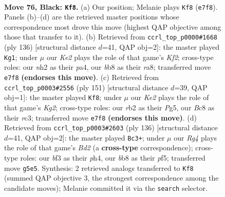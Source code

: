 \documentclass[11pt]{article}
\begin{document}
\clearpage

\begin{figure}[p]\centering
\begin{subfigure}{0.46\textwidth}\centering
\resizebox{\linewidth}{!}{%
\newchessgame
\chessboard[
  setfen={1Bb5/4k3/8/6r1/PPK5/5B1p/1R5N/8 b - - 10 76},
  showmover=false,
  pgfstyle=straightmove, color=movearrow, markmove={e7-f8}
]}
\caption{}
\end{subfigure}\hfill
\begin{subfigure}{0.46\textwidth}\centering
\resizebox{\linewidth}{!}{%
\newchessgame
\chessboard[
  setfen={r5k1/6b1/7p/5R1P/p7/B5P1/5K2/8 w - - 5 69},
  showmover=false,
  pgfstyle=straightmove, color=movearrow, markmove={f2-g1}
]}
\caption{}
\end{subfigure}
\\[4pt]
\begin{subfigure}{0.46\textwidth}\centering
\resizebox{\linewidth}{!}{%
\newchessgame
\chessboard[
  setfen={8/6k1/1n6/1P4p1/3r4/2R3KP/2B5/8 b - - 1 76},
  showmover=false,
  pgfstyle=straightmove, color=movearrow, markmove={g7-f8}
]}
\caption{}
\end{subfigure}\hfill
\begin{subfigure}{0.46\textwidth}\centering
\resizebox{\linewidth}{!}{%
\newchessgame
\chessboard[
  setfen={8/4b1k1/1R6/5p2/4r2p/7P/3B2P1/5K2 w - - 12 69},
  showmover=false,
  pgfstyle=straightmove, color=movearrow, markmove={d2-c3}
]}
\caption{}
\end{subfigure}
\caption{\textbf{Move 76, Black: \texttt{Kf8}.} (a) Our position; Melanie plays \texttt{Kf8} (\texttt{e7f8}). Panels (b)--(d) are the retrieved master positions whose correspondence most drove this move (highest QAP objective among those that transfer to it). (b) Retrieved from \texttt{ccrl\_top\_p0000\#1668} (ply 136) [structural distance $d$=41, QAP obj=2]: the master played \texttt{Kg1}; under $\mu$ our \emph{Ke2} plays the role of that game's \emph{Kf2}; cross-type roles: our \emph{n}h2 as their \emph{p}a4, our \emph{b}b8 as their \emph{r}a8; transferred move \texttt{e7f8} \textbf{(endorses this move)}. (c) Retrieved from \texttt{ccrl\_top\_p0003\#2556} (ply 151) [structural distance $d$=39, QAP obj=1]: the master played \texttt{Kf8}; under $\mu$ our \emph{Ke2} plays the role of that game's \emph{Kg2}; cross-type roles: our \emph{r}b2 as their \emph{P}g5, our \emph{B}c8 as their \emph{r}c3; transferred move \texttt{e7f8} \textbf{(endorses this move)}. (d) Retrieved from \texttt{ccrl\_top\_p0003\#2603} (ply 136) [structural distance $d$=41, QAP obj=2]: the master played \texttt{Bc3+}; under $\mu$ our \emph{Rg4} plays the role of that game's \emph{Bd2} (a \textbf{cross-type} correspondence); cross-type roles: our \emph{b}f3 as their \emph{p}h4, our \emph{b}b8 as their \emph{p}f5; transferred move \texttt{g5e5}. Synthesis: 2 retrieved analogs transferred to \texttt{Kf8} (summed QAP objective 3, the strongest correspondence among the candidate moves); Melanie committed it via the \texttt{search} selector.}
\label{fig:thought-m151}
\end{figure}
\end{document}
